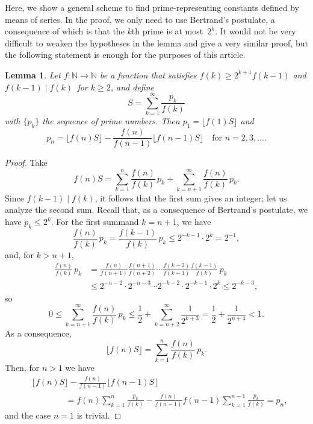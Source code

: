 \documentclass{article}
\theoremstyle{plain}
\newtheorem*{lemma}{Lemma}
\begin{document}
Here, we show a general scheme to find prime-rep\-re\-sent\-ing constants defined by means of series. In the proof, we only need to use Bertrand's postulate, a consequence of which is that the $k$th prime is at most~$2^k$. It would not be very difficult to weaken the hypotheses in the lemma and give a very similar proof, but the following statement is enough for the purposes of this article. 

\begin{lemma}
Let $f : \mathbb{N} \to \mathbb{N}$ be a function that satisfies $f(k) \ge 2^{k+1} f(k-1)$ and \mbox{$f(k-1) \mid f(k)$\,} for $k \ge 2$, and define
\[
  S = \sum_{k=1}^{\infty} \frac{p_k}{f(k)}
\]
with $\{p_k\}$ the sequence of prime numbers.
Then $p_1= \lfloor f(1)S \rfloor$ and
\[
  p_n = \lfloor f(n)S \rfloor - \frac{f(n)}{f(n-1)} \lfloor f(n-1)S \rfloor
  \quad \text{for } n=2,3,\dots.
\]
\end{lemma}

\begin{proof}
Take
\[
  f(n)S = \sum_{k=1}^{n} \frac{f(n)}{f(k)} \,p_k + \sum_{k=n+1}^{\infty} \frac{f(n)}{f(k)} \,p_k.
\]
Since $f(k-1) \mid f(k)$, it follows that the first sum gives an integer;
let us analyze the second sum. 
Recall that, as a consequence of Bertrand's postulate, we have $p_k \le 2^k$.
For the first summand $k = n+1$, we have
\[
  \frac{f(n)}{f(k)} \,p_k = \frac{f(k-1)}{f(k)} \,p_k \le 2^{-k-1} \cdot 2^k = 2^{-1},
\]
and, for $k > n+1$,
\begin{align*}
  \frac{f(n)}{f(k)} \,p_k 
  &= \frac{f(n)}{f(n+1)} \frac{f(n+1)}{f(n+2)} \cdots \frac{f(k-2)}{f(k-1)} \frac{f(k-1)}{f(k)} \,p_k
  \\
  &\le 2^{-n-2} \cdot 2^{-n-3} \cdots 2^{-k-2} \cdot 2^{-k-1} \cdot 2^k
  \le 2^{-k-3},
\end{align*}
so
\[
  0 \le \sum_{k=n+1}^{\infty} \frac{f(n)}{f(k)} \,p_k 
  \le \frac{1}{2} + \sum_{k=n+2}^{\infty} \frac{1}{2^{k+3}} = \frac{1}{2} + \frac{1}{2^{n+4}} < 1.
\]
As a consequence,
\[
  \lfloor f(n)S \rfloor = \sum_{k=1}^{n} \frac{f(n)}{f(k)} \,p_k.
\]
Then, for $n>1$ we have
\begin{align*}
  &\lfloor f(n)S \rfloor - \frac{f(n)}{f(n-1)} \lfloor f(n-1)S \rfloor
  \\
  &\qquad\qquad
  = f(n) \sum_{k=1}^{n} \frac{p_k}{f(k)} - \frac{f(n)}{f(n-1)} f(n-1) \sum_{k=1}^{n-1} \frac{p_k}{f(k)}
  = p_n,
\end{align*}
and the case $n=1$ is trivial.
\end{proof}
\end{document}
